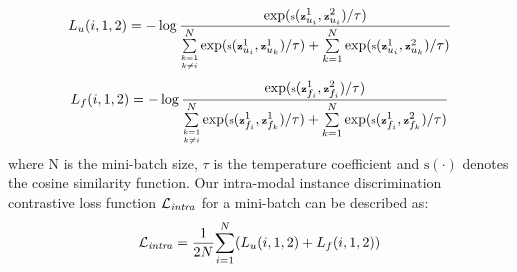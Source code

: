 \begin{equation}
\scriptsize
L_{u}(i, 1, 2) = -\log \frac{\exp(\text{s}(\textbf{z}_{u_i}^{1}, \textbf{z}_{u_i}^{2})/\tau)}{\sum\limits_{\substack{k=1 \\ k \neq i}}^{N} \exp(\text{s}(\textbf{z}_{u_i}^{1}, \textbf{z}_{u_k}^{1})/\tau) + \sum\limits_{k=1}^{N}\exp(\text{s}(\textbf{z}_{u_i}^{1}, \textbf{z}_{u_k}^{2})/\tau)}
\label{equ:equation1}
\end{equation}
\begin{equation}
\scriptsize
L_{f}(i, 1, 2) = -\log \frac{\exp(\text{s}(\textbf{z}_{f_i}^{1}, \textbf{z}_{f_i}^{2})/\tau)}{\sum\limits_{\substack{k=1 \\ k \neq i}}^{N} \exp(\text{s}(\textbf{z}_{f_i}^{1}, \textbf{z}_{f_k}^{1})/\tau) + \sum\limits_{k=1}^{N}\exp(\text{s}(\textbf{z}_{f_i}^{1}, \textbf{z}_{f_k}^{2})/\tau)}
\label{equ:equation2}
\end{equation}
\noindent where N is the mini-batch size, $\tau$ is the temperature coefficient and \(\text{s}(\cdot)\) denotes the cosine similarity function. Our intra-modal instance discrimination contrastive loss function $\mathcal{L}_{\text{\textit{intra}}}$ for a mini-batch can be described as:
\vspace{-5pt}
\begin{equation}
\mathcal{L}_{\text{\textit{intra}}} = \frac{1}{2N}{\sum_{i=1}^{N} (L_u(i, 1, 2) + L_f(i, 1, 2)})
\end{equation}
\vspace{-5pt}


